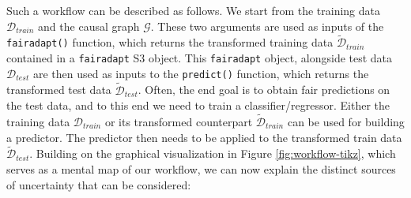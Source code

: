 \documentclass[
  nojss]{jss}
\begin{document}
Such a workflow can be described as follows. We start from the training
data \(\mathcal{D}_{train}\) and the causal graph \(\mathcal{G}\). These
two arguments are used as inputs of the \texttt{fairadapt()} function,
which returns the transformed training data
\(\widetilde{\mathcal{D}}_{train}\) contained in a \texttt{fairadapt} S3
object. This \texttt{fairadapt} object, alongside test data
\(\mathcal{D}_{test}\) are then used as inputs to the \texttt{predict()}
function, which returns the transformed test data
\(\widetilde{\mathcal{D}}_{test}\). Often, the end goal is to obtain
fair predictions on the test data, and to this end we need to train a
classifier/regressor. Either the training data \(\mathcal{D}_{train}\)
or its transformed counterpart \(\widetilde{\mathcal{D}}_{train}\) can
be used for building a predictor. The predictor then needs to be applied
to the transformed train data \(\widetilde{\mathcal{D}}_{test}\).
Building on the graphical visualization in Figure
\ref{fig:workflow-tikz}, which serves as a mental map of our workflow,
we can now explain the distinct sources of uncertainty that can be
considered:
\end{document}
